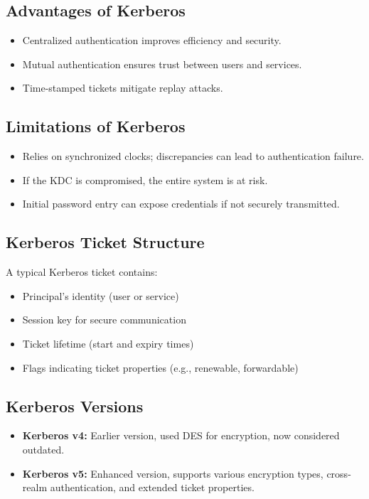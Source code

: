 \documentclass[11pt]{article}
\begin{document}
\subsection{Advantages of Kerberos}
\begin{itemize}
\item Centralized authentication improves efficiency and security.
\item Mutual authentication ensures trust between users and services.
\item Time-stamped tickets mitigate replay attacks.
\end{itemize}

\subsection{Limitations of Kerberos}
\begin{itemize}
\item Relies on synchronized clocks; discrepancies can lead to authentication failure.
\item If the KDC is compromised, the entire system is at risk.
\item Initial password entry can expose credentials if not securely transmitted.
\end{itemize}

\subsection{Kerberos Ticket Structure}
A typical Kerberos ticket contains:
\begin{itemize}
\item Principal's identity (user or service)
\item Session key for secure communication
\item Ticket lifetime (start and expiry times)
\item Flags indicating ticket properties (e.g., renewable, forwardable)
\end{itemize}

\subsection{Kerberos Versions}
\begin{itemize}
\item \textbf{Kerberos v4:} Earlier version, used DES for encryption, now considered outdated.
\item \textbf{Kerberos v5:} Enhanced version, supports various encryption types, cross-realm authentication, and extended ticket properties.
\end{itemize}
\end{document}
